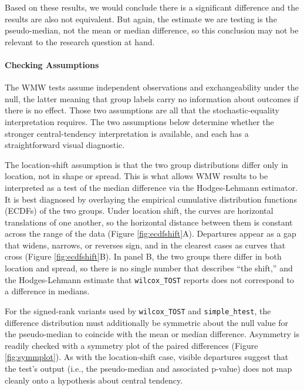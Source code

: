 \documentclass[]{interact}
\theoremstyle{plain}%
\theoremstyle{definition}
\theoremstyle{remark}
\begin{document}
Based on these results, we would conclude there is a significant
difference and the results are also not equivalent. But again, the
estimate we are testing is the pseudo-median, not the mean or median
difference, so this conclusion may not be relevant to the research
question at hand.

\paragraph{Checking Assumptions}\label{checking-assumptions-3}

The WMW tests assume independent observations and exchangeability under
the null, the latter meaning that group labels carry no information
about outcomes if there is no effect. Those two assumptions are all that
the stochastic-equality interpretation requires. The two assumptions
below determine whether the stronger central-tendency interpretation is
available, and each has a straightforward visual diagnostic.

The location-shift assumption is that the two group distributions differ
only in location, not in shape or spread. This is what allows WMW
results to be interpreted as a test of the median difference via the
Hodges-Lehmann estimator. It is best diagnosed by overlaying the
empirical cumulative distribution functions (ECDFs) of the two groups.
Under location shift, the curves are horizontal translations of one
another, so the horizontal distance between them is constant across the
range of the data (Figure \ref{fig:ecdfshift}A). Departures appear as a
gap that widens, narrows, or reverses sign, and in the clearest cases as
curves that cross (Figure \ref{fig:ecdfshift}B). In panel B, the two
groups there differ in both location and spread, so there is no single
number that describes ``the shift,'' and the Hodges-Lehmann estimate
that \texttt{wilcox\_TOST} reports does not correspond to a difference
in medians.

For the signed-rank variants used by \texttt{wilcox\_TOST} and
\texttt{simple\_htest}, the difference distribution must additionally be
symmetric about the null value for the pseudo-median to coincide with
the mean or median difference. Asymmetry is readily checked with a
symmetry plot of the paired differences (Figure \ref{fig:symmplot}). As
with the location-shift case, visible departures suggest that the test's
output (i.e., the pseudo-median and associated p-value) does not map
cleanly onto a hypothesis about central tendency.
\end{document}
